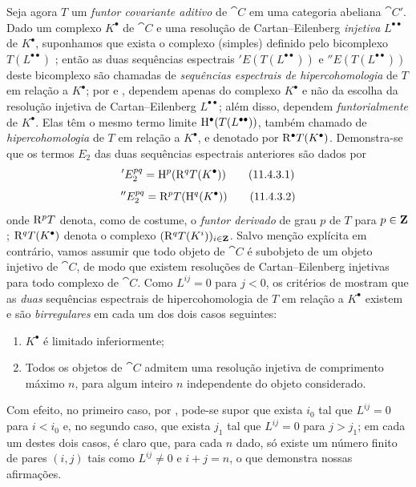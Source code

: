 \begin{env}[11.4.3]
\label{0.11.4.3}
Seja agora $T$ um \emph{funtor covariante aditivo} de $\cat{C}$ em uma categoria abeliana $\cat{C'}$.
Dado um complexo $K^\bullet$ de $\cat{C}$ e uma resolução de Cartan--Eilenberg \emph{injetiva} $L^{\bullet\bullet}$ de $K^{\bullet}$, suponhamos que exista o complexo (simples) definido pelo bicomplexo $T(L^{\bullet\bullet})$ ;
então as duas sequências espectrais $'E(T(L^{\bullet\bullet}))$ e $''E(T(L^{\bullet\bullet}))$ deste bicomplexo são chamadas de \emph{sequências espectrais de hipercohomologia} de $T$ em relação a $K^\bullet$;
por  e , dependem apenas do complexo $K^\bullet$ e não da escolha da resolução injetiva de Cartan--Eilenberg $L^{\bullet\bullet}$;
além disso, dependem \emph{funtorialmente} de $K^\bullet$.
Elas têm o mesmo termo limite $\mathrm{H}^\bullet(T(L^{\bullet\bullet}))$, também chamado de \emph{hipercohomologia} de $T$ em relação a $K^\bullet$, e denotado por $\mathrm{R}^\bullet T(K^\bullet)$.
Demonstra-se que os termos $E_2$ das duas sequências espectrais anteriores são dados por
\[
\label{0.11.4.3.1}
  'E_2^{pq}
  = \HH^p(\RR^q T(K^\bullet))
\tag{11.4.3.1}
\]
\[
\label{0.11.4.3.2}
  ''E_2^{pq}
  = \RR^p T(\HH^q(K^\bullet))
\tag{11.4.3.2}
\]
onde $\mathrm{R}^p T$ denota, como de costume, o \emph{funtor derivado} de grau $p$ de $T$ para $p\in\mathbf{Z}$;
$\mathrm{R}^q T(K^\bullet)$ denota o complexo $(\mathrm{R}^q T(K^i))_{i\in\mathbf{Z}}$.
\label{0.11.4.4}
Salvo menção explícita em contrário, vamos assumir que todo objeto de $\cat{C}$ é subobjeto de um objeto injetivo de $\cat{C}$, de modo que existem resoluções de Cartan--Eilenberg injetivas para todo complexo de $\cat{C}$.
Como $L^{ij}=0$ para $j<0$, os critérios de  mostram que as \emph{duas} sequências espectrais de hipercohomologia de $T$ em relação a $K^\bullet$ existem e são \emph{birregulares} em cada um dos dois casos seguintes:
\begin{enumerate}
  \item $K^\bullet$ é limitado inferiormente;
  \item Todos os objetos de $\cat{C}$ admitem uma resolução injetiva de comprimento máximo $n$, para algum inteiro $n$ independente do objeto considerado.
\end{enumerate}
Com efeito, no primeiro caso, por , pode-se supor que exista $i_0$ tal que $L^{ij}=0$ para $i<i_0$ e, no segundo caso, que exista $j_1$ tal que $L^{ij}=0$ para $j>j_1$;
em cada um destes dois casos, é claro que, para cada $n$ dado, só existe um número finito de pares $(i,j)$ tais como $L^{ij}\neq 0$ e $i+j=n$, o que demonstra nossas afirmações.


\end{env}
